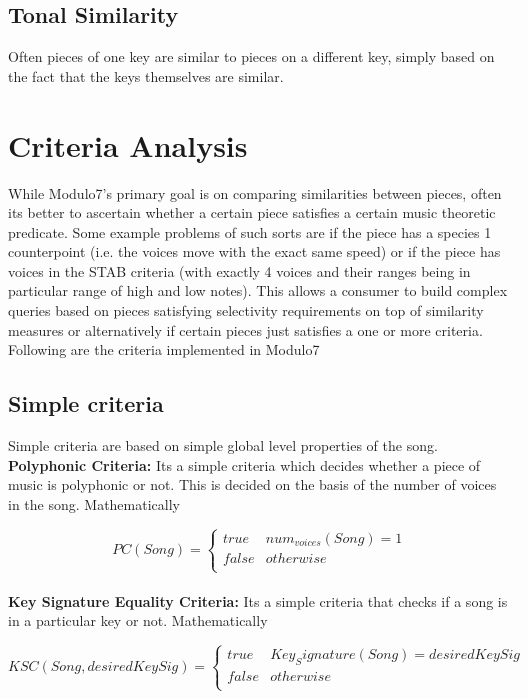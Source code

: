\subsection{Tonal Similarity}

\noindent Often pieces of one key are similar to pieces on a different key, simply based on the fact that the keys themselves are similar. 


\section{Criteria Analysis}

\noindent While Modulo7's primary goal is on comparing similarities between pieces, often its better to ascertain whether a certain piece satisfies a certain music theoretic predicate. Some example problems of such sorts are if the piece has a species 1 counterpoint (i.e. the voices move with the exact same speed) or if the piece has voices in the STAB criteria (with exactly 4 voices and their ranges being in particular range of high and low notes). This allows a consumer to build complex queries based on pieces satisfying selectivity requirements on top of similarity measures or alternatively if certain pieces just satisfies a one or more criteria. Following are the criteria implemented in Modulo7

\subsection{Simple criteria} 

\noindent Simple criteria are based on simple global level properties of the song. \\

\noindent \textbf{Polyphonic Criteria:} Its a simple criteria which decides whether a piece of music is polyphonic or not. This is decided on the basis of the number of voices in the song. Mathematically

\[ PC(Song) =  \begin{cases} 
      true & num_{voices}(Song) = 1 \\
      false &  otherwise \\
   \end{cases}
\] \\

\noindent \textbf{Key Signature Equality Criteria:} Its a simple criteria that checks if a song is in a particular key or not. Mathematically

\[ KSC(Song, desiredKeySig) =  \begin{cases} 
      true & Key_Signature(Song) = desiredKeySig \\
      false &  otherwise \\
   \end{cases}
\] \\

